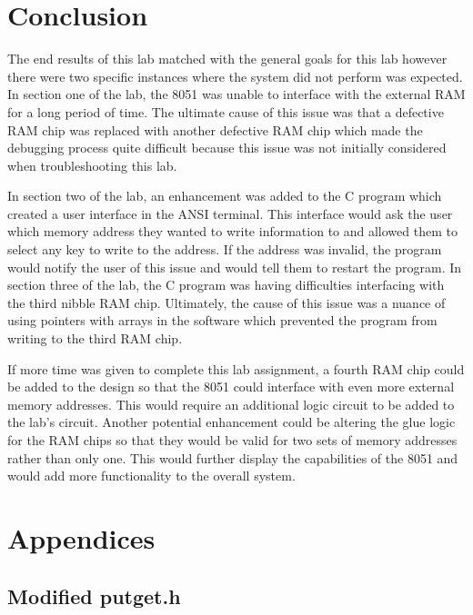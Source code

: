 \documentclass[12pt]{article}
\begin{document}
\section{Conclusion}
The end results of this lab matched with the general goals for this lab however there were two specific instances where the system did not perform was expected. In section one of the lab, the 8051 was unable to interface with the external RAM for a long period of time. The ultimate cause of this issue was that a defective RAM chip was replaced with another defective RAM chip which made the debugging process quite difficult because this issue was not initially considered when troubleshooting this lab. 

In section two of the lab, an enhancement was added to the C program which created a user interface in the ANSI terminal. This interface would ask the user which memory address they wanted to write information to and allowed them to select any key to write to the address. If the address was invalid, the program would notify the user of this issue and would tell them to restart the program. In section three of the lab, the C program was having difficulties interfacing with the third nibble RAM chip. Ultimately, the cause of this issue was a nuance of using pointers with arrays in the software which prevented the program from writing to the third RAM chip. 

If more time was given to complete this lab assignment, a fourth RAM chip could be added to the design so that the 8051 could interface with even more external memory addresses. This would require an additional logic circuit to be added to the lab’s circuit. Another potential enhancement could be altering the glue logic for the RAM chips so that they would be valid for two sets of memory addresses rather than only one. This would further display the capabilities of the 8051 and would add more functionality to the overall system. 


\section{Appendices}
\subsection{Modified putget.h}

\end{document}
